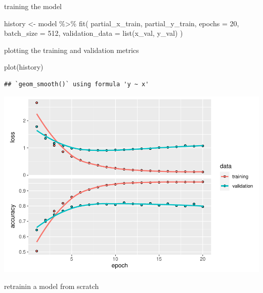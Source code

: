 \documentclass[]{article}
\newenvironment{Shaded}{\begin{snugshade}}{\end{snugshade}}
\newcommand{\AttributeTok}[1]{\textcolor[rgb]{0.77,0.63,0.00}{#1}}
\newcommand{\DecValTok}[1]{\textcolor[rgb]{0.00,0.00,0.81}{#1}}
\newcommand{\FunctionTok}[1]{\textcolor[rgb]{0.00,0.00,0.00}{#1}}
\newcommand{\NormalTok}[1]{#1}
\newcommand{\OtherTok}[1]{\textcolor[rgb]{0.56,0.35,0.01}{#1}}
\newcommand{\SpecialCharTok}[1]{\textcolor[rgb]{0.00,0.00,0.00}{#1}}
\begin{document}
training the model

\begin{Shaded}
\begin{Highlighting}[]
\NormalTok{history }\OtherTok{\textless{}{-}}\NormalTok{ model }\SpecialCharTok{\%\textgreater{}\%} \FunctionTok{fit}\NormalTok{(}
\NormalTok{  partial\_x\_train, }
\NormalTok{  partial\_y\_train,}
  \AttributeTok{epochs =} \DecValTok{20}\NormalTok{,}
  \AttributeTok{batch\_size =} \DecValTok{512}\NormalTok{,}
  \AttributeTok{validation\_data =} \FunctionTok{list}\NormalTok{(x\_val, y\_val)}
\NormalTok{)}
\end{Highlighting}
\end{Shaded}

plotting the training and validation metrics

\begin{Shaded}
\begin{Highlighting}[]
\FunctionTok{plot}\NormalTok{(history)}
\end{Highlighting}
\end{Shaded}

\begin{verbatim}
## `geom_smooth()` using formula 'y ~ x'
\end{verbatim}

\includegraphics{Returners_dataset_files/figure-latex/unnamed-chunk-12-1.pdf}

retrainin a model from scratch
\end{document}
